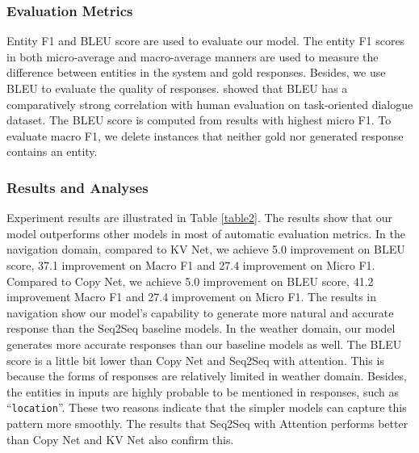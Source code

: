 \documentclass[11pt]{article}
\begin{document}
\subsubsection{Evaluation Metrics}

Entity F1 and BLEU score are used to evaluate our model.
	The entity F1 scores in both micro-average and macro-average manners are used to measure the difference between entities in the system and gold responses. Besides, we use BLEU to evaluate the quality of responses.  showed that BLEU has a comparatively strong correlation with human evaluation on task-oriented dialogue dataset. The BLEU score is computed from results with highest micro F1. To evaluate macro F1, we delete instances that neither gold nor generated response contains an entity.

\subsubsection{Results and Analyses}
Experiment results are illustrated in Table \ref{table2}. 
The results show that our model outperforms other models in most of automatic evaluation metrics. 
In the navigation domain, compared to KV Net, we achieve 5.0 improvement on BLEU score, 37.1 improvement on Macro F1 and 27.4 improvement on Micro F1. 
Compared to Copy Net, we achieve 5.0 improvement on BLEU score, 41.2 improvement Macro F1 and 27.4 improvement on Micro F1. 
The results in navigation show our model's capability to generate more natural and accurate response than the Seq2Seq baseline models. 
In the weather domain, our model generates more accurate responses than our baseline models as well. 
The BLEU score is a little bit lower than Copy Net and Seq2Seq with attention. This is because the forms of responses are relatively limited in weather domain.
Besides, the entities in inputs are highly probable to be mentioned in responses, such as ``\texttt{location}''. These two reasons indicate that the simpler models can capture this pattern more smoothly.
The results that Seq2Seq with Attention performs better than Copy Net and KV Net also confirm this.
\end{document}
